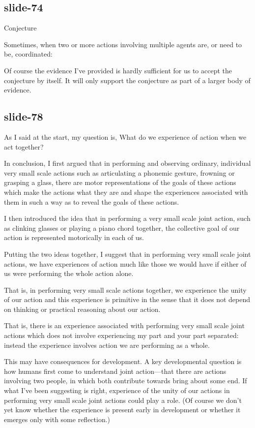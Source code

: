 \documentclass[12pt,\papersize]{extarticle}
\begin{document}
\subsection{slide-74}
Conjecture



Sometimes, when two or more actions involving multiple agents are, or need to be, coordinated:


Of course the evidence I’ve provided is hardly sufficient for us to accept the
conjecture by itself.  It will only support the conjecture as part of a larger body
of evidence.

\subsection{slide-78}
As I said at the start, my question is,
What do we experience of action when we act together?

In conclusion, I first argued that
in performing and observing ordinary, individual very small scale actions such as
articulating a phonemic gesture, frowning or grasping a glass,
there are motor representations of the goals of these actions
which make the actions what they are
and shape the experiences associated with them in such a way as to
reveal the goals of these actions.

I then introduced the idea that in performing a very small scale joint action,
such as clinking glasses or playing a piano chord together,
the collective goal of our action is represented  motorically in each of us.

Putting the two ideas together, I suggest that in performing very small scale joint actions,
we have experiences of action much like those we would have if either of us were performing
the whole action alone.

That is, in performing very small scale actions together, we experience the unity of our action
and this experience is primitive in the sense that it does not depend on thinking or
practical reasoning about our action.

That is, there is an experience associated with performing very small scale joint actions
which does not involve experiencing
my part and your part separated: instead the experience involves action we are performing
as a whole.

This may have consequences for development.  A key developmental question is how humans
first come to understand joint action---that there are actions involving two people, in which
both contribute towards bring about some end.  If what I’ve been suggesting is right,
experience of the unity of our actions in performing very small scale joint actions could
play a role. (Of course we don’t yet know whether the experience is present early in development
or whether it emerges only with some reflection.)
\end{document}
